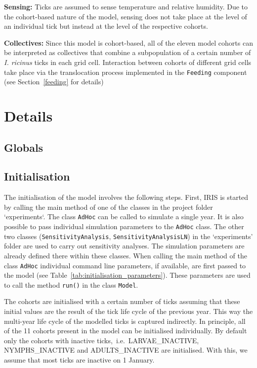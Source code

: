 \documentclass[a4paper, 11pt]{scrartcl}
\newcommand{\inlinecode}[1]{\texttt{\small #1}}
\begin{document}
\textbf{Sensing:} Ticks are assumed to sense temperature and relative humidity. Due to the cohort-based nature of the model, sensing does not take place at the level of an individual tick but instead at the level of the respective cohorts.

\textbf{Collectives:} Since this model is cohort-based, all of the eleven model cohorts can be interpreted as collectives that combine a subpopulation of a certain number of \emph{I. ricinus} ticks in each grid cell. Interaction between cohorts of different grid cells take place via the translocation process implemented in the \inlinecode{Feeding} component (see Section~\ref{feeding} for details)


\newpage
\section{Details}

\subsection{Globals}

\subsection{Initialisation}\label{initialisation}
The initialisation of the model involves the following steps. First, IRIS is started by calling the main method of one of the classes in the project folder `experiments`. The class \inlinecode{AdHoc} can be called to simulate a single year. It is also possible to pass individual simulation parameters to the \inlinecode{AdHoc} class. The other two classes (\inlinecode{SensitivityAnalysis}, \inlinecode{SensitivityAnalysisLN}) in the `experiments' folder are used to carry out sensitivity analyses. The simulation parameters are already defined there within these classes. When calling the main method of the class \inlinecode{AdHoc} individual command line parameters, if available, are first passed to the model (see Table~\ref{tab:initialisation_parameters}). These parameters are used to call the method \inlinecode{run()} in the class \inlinecode{Model}. 

The cohorts are initialised with a certain number of ticks assuming that these initial values are the result of the tick life cycle of the previous year. This way the multi-year life cycle of the modelled ticks is captured indirectly. In principle, all of the 11 cohorts present in the model can be initialised individually. By default only the cohorts with inactive ticks,~i.e.\ LARVAE\_INACTIVE, NYMPHS\_INACTIVE and ADULTS\_INACTIVE are initialised. With this, we assume that most ticks are inactive on 1 January.
\end{document}
